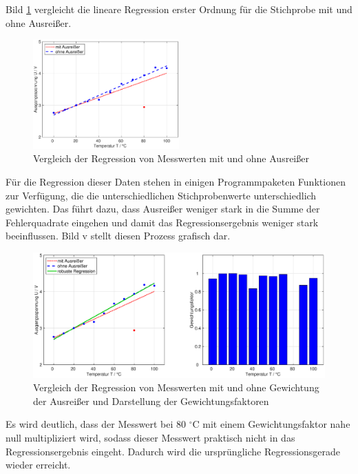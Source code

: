 \noindent Bild \ref{fig:RegressionRobust} vergleicht die lineare Regression erster Ordnung f\"{u}r die Stichprobe mit und ohne Ausrei{\ss}er.

\noindent 
\begin{figure}[H]
  \centerline{\includegraphics[width=0.5\textwidth]{Kapitel12/Bilder/image18}}
  \caption{Vergleich der Regression von Messwerten mit und ohne Ausrei{\ss}er}
  \label{fig:RegressionRobust}
\end{figure}

\noindent F\"{u}r die Regression dieser Daten stehen in einigen Programmpaketen Funktionen zur Verf\"{u}gung, die die unterschiedlichen Stichprobenwerte unterschiedlich gewichten. Das f\"{u}hrt dazu, dass Ausrei{\ss}er weniger stark in die Summe der Fehlerquadrate eingehen und damit das Regressionsergebnis weniger stark beeinflussen. Bild v stellt diesen Prozess grafisch dar.

\noindent 
\begin{figure}[H]
  \centerline{\includegraphics[width=1\textwidth]{Kapitel12/Bilder/image19}}
  \caption{Vergleich der Regression von Messwerten mit und ohne Gewichtung der Ausrei{\ss}er und Darstellung der Gewichtungsfaktoren}
  \label{fig:RegressionRobust2}
\end{figure}

\noindent Es wird deutlich, dass der Messwert bei 80 $^\circ$C mit einem Gewichtungsfaktor nahe null multipliziert wird, sodass dieser Messwert praktisch nicht in das Regressionsergebnis eingeht. Dadurch wird die urspr\"{u}ngliche Regressionsgerade wieder erreicht. 


